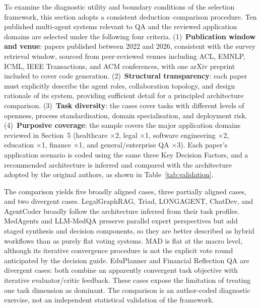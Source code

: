 To examine the diagnostic utility and boundary conditions of the selection
framework, this section adopts a consistent deduction--comparison procedure.
Ten published multi-agent systems relevant to QA and the reviewed application
domains are selected under
the following four criteria.
(1)~\textbf{Publication window and venue}: papers published between 2022 and
2026, consistent with the survey retrieval window, sourced from peer-reviewed
venues including ACL, EMNLP, ICML, IEEE Transactions, and ACM conferences,
with one arXiv preprint included to cover code generation.
(2)~\textbf{Structural transparency}: each paper must explicitly describe
the agent roles, collaboration topology, and design rationale of its system,
providing sufficient detail for a principled architecture comparison.
(3)~\textbf{Task diversity}: the cases cover tasks with different levels of
openness, process standardisation, domain specialisation, and deployment risk.
(4)~\textbf{Purposive coverage}: the sample covers
the major application domains reviewed in Section~5 (healthcare $\times$2,
legal $\times$1, software engineering $\times$2, education $\times$1,
finance $\times$1, and general/enterprise QA $\times$3).
Each paper's application scenario is coded using the same three Key Decision
Factors, and a recommended architecture is inferred and compared with the
architecture adopted by the original authors, as shown in
Table~\ref{tab:validation}.

The comparison yields five broadly aligned cases, three partially aligned
cases, and two divergent cases. LegalGraphRAG, Triad, LONGAGENT, ChatDev, and
AgentCoder broadly follow the architecture inferred from their task profiles.
MedAgents and LLM-MedQA preserve parallel expert perspectives but add staged
synthesis and decision components, so they are better described as hybrid
workflows than as purely flat voting systems. MAD
\citep{du2024multiagent_debate} is flat at the macro level, although its
iterative convergence procedure is not the explicit vote round anticipated
by the decision guide. EduPlanner \citep{zhang2024eduplanner} and Financial
Reflection QA \citep{fatemi2024financialqa} are divergent cases: both combine
an apparently convergent task objective with iterative evaluator/critic
feedback. These cases expose the limitation of treating one task dimension
as dominant. The comparison is an author-coded diagnostic exercise, not an
independent statistical validation of the framework.

